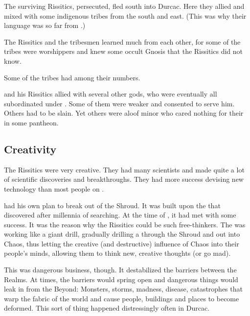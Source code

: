 The surviving Rissitics, persecuted, fled south into Durcac. 
Here they allied and mixed with some indigenous tribes from the south and east. 
(This was why their language was so far from \Ortaican.)

The Rissitics and the tribesmen learned much from each other, for some of the tribes were \xs{} worshippers and knew some occult Gnosis that the Rissitics did not know. 

Some of the tribes had  among their numbers. 

\Secherdamon{} and his Rissitics allied with several other gods, who were eventually all subordinated under \Secherdamon. 
Some of them were weaker and consented to serve him. 
Others had to be slain. 
Yet others were aloof minor \xss{} who cared nothing for their  in some \Miithian{} pantheon.





\subsection{Creativity}
The Rissitics were very creative. 
They had many scientists and made quite a lot of scientific discoveries and breakthroughs. 
They had more success devising new technology than most people on \Miith{} . 

\Secherdamon{} had his own plan to break out of the Shroud. 
It was built upon the  that \Secherdamon{} discovered after millennia of searching. 
At the time of , it had met with some success. 
It was the reason why the Rissitics could be such free-thinkers. 
The  was working like a giant drill, gradually drilling a  through the Shroud and out into Chaos, thus letting the creative (and destructive) influence of Chaos into their people's minds, allowing them to think new, creative thoughts (or go mad). 

This  was dangerous business, though. 
It destabilized the barriers between the Realms. 
At times, the barriers would spring open and dangerous things would leak in from the Beyond: 
Monsters, storms, madness, disease, catastrophes that warp the fabric of the world and cause people, buildings and places to become deformed. 
This sort of thing happened distressingly often in Durcac. 

